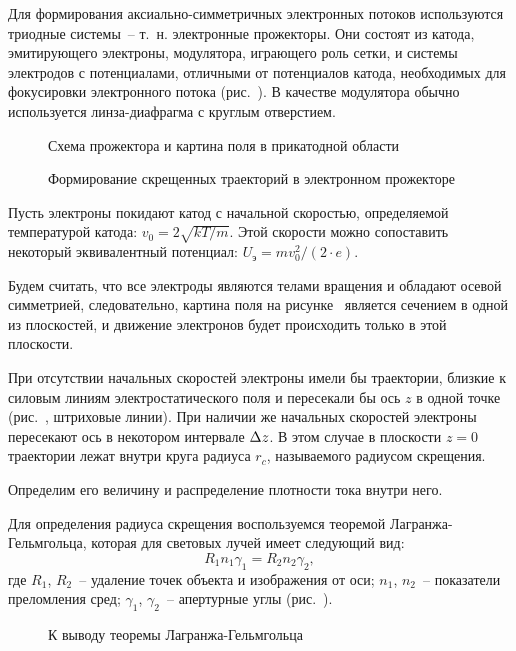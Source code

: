 
Для формирования аксиально-симметричных электронных потоков используются
триодные системы~-- т.~н. электронные прожекторы. Они состоят из катода,
эмитирующего электроны, модулятора, играющего роль сетки, и системы электродов с
потенциалами, отличными от потенциалов катода, необходимых для фокусировки
электронного потока (рис.~). В качестве модулятора обычно
используется линза-диафрагма с круглым отверстием.
\begin{figure}[h!]
  \center
  \parbox{.3\textwidth}{\caption{Схема прожектора и картина поля в прикатодной
    области} \label{pic23scheme}} \hspace{1em}
  \parbox{.5\textwidth}{\caption{Формирование скрещенных траекторий в
    электронном прожекторе} \label{pic23paths}}
\end{figure}

Пусть электроны покидают катод с начальной скоростью, определяемой температурой
катода: \( v_0 = 2\sqrt{kT / m} \). Этой скорости можно сопоставить некоторый
эквивалентный потенциал: \( U_\text{э} = mv_0^2 / (2 \cdot e) \).

Будем считать, что все электроды являются телами вращения и обладают осевой
симметрией, следовательно, картина поля на рисунке~ является
сечением в одной из плоскостей, и движение электронов будет происходить только
в этой плоскости.

При отсутствии начальных скоростей электроны имели бы траектории, близкие к
силовым линиям электростатического поля и пересекали бы ось \( z \) в одной
точке (рис.~, штриховые линии). При наличии же начальных скоростей
электроны пересекают ось в некотором интервале \( \Delta z \). В этом случае в
плоскости \( z = 0 \) траектории лежат внутри круга радиуса \( r_c \),
называемого радиусом скрещения.

Определим его величину и распределение плотности тока внутри него.

Для определения радиуса скрещения воспользуемся теоремой Лагранжа-Гельмгольца,
которая для световых лучей имеет следующий вид:
\begin{equation}
  R_1 n_1 \gamma_1 = R_2 n_2 \gamma_2,
  \label{eq23optic}
\end{equation}
где \( R_1 \), \( R_2 \)~-- удаление точек объекта и изображения от оси;
\( n_1 \), \( n_2 \)~-- показатели преломления сред; \( \gamma_1 \),
\( \gamma_2 \)~-- апертурные углы (рис.~).
\begin{figure}[hb!]
  \center
  \caption{К выводу теоремы Лагранжа-Гельмгольца}
  \label{pic23theorem}
\end{figure}

